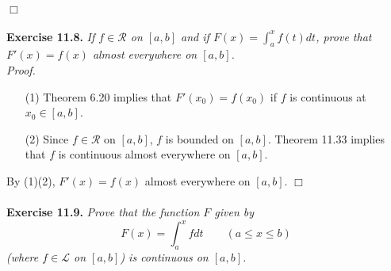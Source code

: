 \documentclass{article}
\begin{document}
$\Box$ \\\\






\textbf{Exercise 11.8.}
\emph{If $f \in \mathscr{R}$ on $[a,b]$ and if $F(x) = \int_{a}^{x}f(t)dt$,
prove that $F'(x) = f(x)$ almost everywhere on $[a,b]$.} \\

\emph{Proof.}
\begin{enumerate}
\item[(1)]
  Theorem 6.20 implies that
  $F'(x_0) = f(x_0)$ if $f$ is continuous at $x_0 \in [a,b]$.

\item[(2)]
  Since $f \in \mathscr{R}$ on $[a,b]$, $f$ is bounded on $[a,b]$.
  Theorem 11.33 implies that
  $f$ is continuous almost everywhere on $[a,b]$.
\end{enumerate}
By (1)(2), $F'(x) = f(x)$ almost everywhere on $[a,b]$.
$\Box$ \\\\






\textbf{Exercise 11.9.}
\emph{Prove that the function $F$ given by
\[
  F(x) = \int_{a}^{x} f dt
  \qquad
  (a \leq x \leq b)
\]
(where $f \in \mathscr{L}$ on $[a,b]$) is continuous on $[a,b]$.} \\
\end{document}
